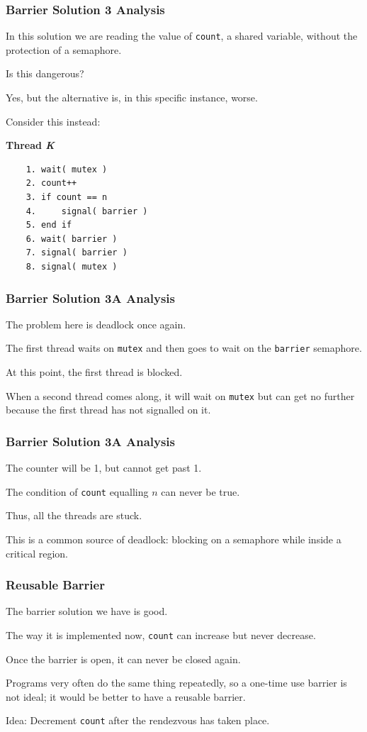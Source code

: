 \begin{frame}[fragile]
\frametitle{Barrier Solution 3 Analysis}

In this solution we are reading the value of \texttt{count}, a shared variable, without the protection of a semaphore. 

Is this dangerous? 

Yes, but the alternative is, in this specific instance, worse. 

Consider this instead:

\textbf{Thread \textit{K}}\vspace{-2em}
  \begin{verbatim}
	1. wait( mutex )
	2. count++
	3. if count == n
	4.     signal( barrier )
	5. end if
	6. wait( barrier )
	7. signal( barrier )
	8. signal( mutex )
  \end{verbatim}
\vspace{-2em}

\end{frame}

\begin{frame}
\frametitle{Barrier Solution 3A Analysis}

The problem here is deadlock once again. 

The first thread waits on \texttt{mutex} and then goes to wait on the \texttt{barrier} semaphore. 

At this point, the first thread is blocked.

When a second thread comes along, it will wait on \texttt{mutex} but can get no further because the first thread has not signalled on it. 


\end{frame}

\begin{frame}
\frametitle{Barrier Solution 3A Analysis}

The counter will be 1, but cannot get past 1. 

The condition of \texttt{count} equalling $n$ can never be true. 

Thus, all the threads are stuck. 

This is a common source of deadlock: blocking on a semaphore while inside a critical region.

\end{frame}

\begin{frame}
\frametitle{Reusable Barrier}

The barrier solution we have is good.

The way it is implemented now, \texttt{count} can increase but never decrease.

Once the barrier is open, it can never be closed again.

Programs very often do the same thing repeatedly, so a one-time use barrier is not ideal; it would be better to have a reusable barrier.

Idea: Decrement \texttt{count} after the rendezvous has taken place. 

\end{frame}

